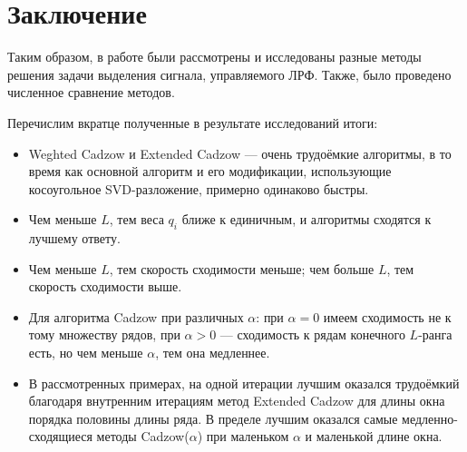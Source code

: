 \documentclass[12pt,a4paper,fleqn,leqno]{article}
\begin{document}
\clearpage
\section*{Заключение}
Таким образом, в работе были рассмотрены и исследованы разные методы решения задачи выделения сигнала, управляемого ЛРФ. Также, было проведено численное сравнение методов.

Перечислим вкратце полученные в результате исследований итоги:
\begin{itemize}
\item Weghted Cadzow и Extended Cadzow --- очень трудоёмкие алгоритмы, в то время как основной алгоритм и его модификации, использующие косоугольное SVD-разложение, примерно одинаково быстры.
\item Чем меньше $L$, тем веса $q_i$ ближе к единичным, и алгоритмы сходятся к лучшему ответу.
\item Чем меньше $L$, тем скорость сходимости меньше; чем больше $L$, тем скорость сходимости выше.
\item Для алгоритма Cadzow при различных $\alpha$: при $\alpha = 0$ имеем сходимость не к тому множеству рядов, при $\alpha > 0$ --- сходимость к рядам конечного $L$-ранга есть, но чем меньше $\alpha$, тем она медленнее.
\item
В рассмотренных примерах, на одной итерации лучшим оказался трудоёмкий благодаря внутренним итерациям метод Extended Cadzow для длины окна порядка половины длины ряда.
В пределе лучшим оказался самые медленно-сходящиеся методы Cadzow($\alpha$) при маленьком $\alpha$ и маленькой длине окна.
\end{itemize}




\end{document}
